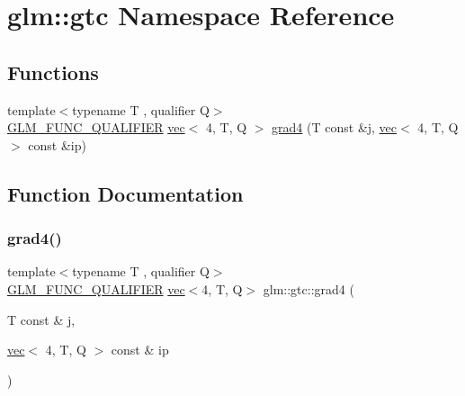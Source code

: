 \hypertarget{namespaceglm_1_1gtc}{}\section{glm\+:\+:gtc Namespace Reference}
\label{namespaceglm_1_1gtc}
\subsection*{Functions}
\begin{DoxyCompactItemize}
\item 
{\footnotesize template$<$typename T , qualifier Q$>$ }\\\mbox{\hyperlink{setup_8hpp_a33fdea6f91c5f834105f7415e2a64407}{G\+L\+M\+\_\+\+F\+U\+N\+C\+\_\+\+Q\+U\+A\+L\+I\+F\+I\+ER}} \mbox{\hyperlink{structglm_1_1vec}{vec}}$<$ 4, T, Q $>$ \mbox{\hyperlink{namespaceglm_1_1gtc_a3e64854dc3369fadffdc335c55a90fd5}{grad4}} (T const \&j, \mbox{\hyperlink{structglm_1_1vec}{vec}}$<$ 4, T, Q $>$ const \&ip)
\end{DoxyCompactItemize}


\subsection{Function Documentation}
\mbox{\label{namespaceglm_1_1gtc_a3e64854dc3369fadffdc335c55a90fd5}} 
\subsubsection{\texorpdfstring{grad4()}{grad4()}}
{\footnotesize\ttfamily template$<$typename T , qualifier Q$>$ \\
\mbox{\hyperlink{setup_8hpp_a33fdea6f91c5f834105f7415e2a64407}{G\+L\+M\+\_\+\+F\+U\+N\+C\+\_\+\+Q\+U\+A\+L\+I\+F\+I\+ER}} \mbox{\hyperlink{structglm_1_1vec}{vec}}$<$4, T, Q$>$ glm\+::gtc\+::grad4 (\begin{DoxyParamCaption}\item[{T const \&}]{j,  }\item[{\mbox{\hyperlink{structglm_1_1vec}{vec}}$<$ 4, T, Q $>$ const \&}]{ip }\end{DoxyParamCaption})}

